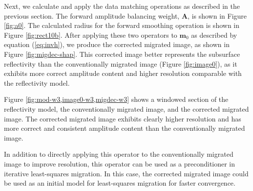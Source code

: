     Next, we calculate and apply the data matching operations as described in the previous section. 
    The forward amplitude balancing weight, $\mathbf{A}$, is shown in Figure \ref{fig:a0}.
    The calculated radius for the forward smoothing operation is shown in Figure \ref{fig:rect10b}.
    After applying these two operators to $\mathbf{m}_0$ as described by equation (\ref{eq:invh}), we produce the corrected migrated image, as shown in Figure \ref{fig:migdec-shap}.
    This corrected image better represents the subsurface reflectivity than the conventionally migrated image (Figure \ref{fig:image0}), as it exhibits more correct amplitude content and higher resolution comparable with the reflectivity model.

    Figure \ref{fig:mod-w3,image0-w3,migdec-w3} shows a windowed section of the reflectivity model, the conventionally migrated image, and the corrected migrated image.
    The corrected migrated image exhibits clearly higher resolution and has more correct and consistent amplitude content than the conventionally migrated image.

%

    In addition to directly applying this operator to the conventionally migrated image to improve resolution, this operator can be used as a preconditioner in iterative least-squares migration.
    In this case, the corrected migrated image could be used as an initial model for least-squares migration for faster convergence.

